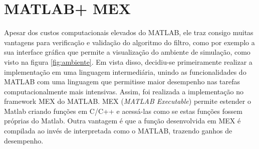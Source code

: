 \documentclass[
	12pt,				%
	openright,			%
	oneside,			%
	a4paper,			%
	english,			%
	french,				%
	spanish,			%
	brazil,				%
	]{abntex2}
\begin{document}



\section{MATLAB\texttrademark + MEX}
\label{sec:matlab_mex}

Apesar dos custos computacionais elevados do MATLAB, ele traz consigo muitas vantagens para verificação e validação do algoritmo do filtro, como por exemplo a sua interface gráfica que permite a visualização do ambiente de simulação, como visto na figura \ref{fig:ambiente}. Em vista disso, decidiu-se primeiramente realizar a implementação em uma linguagem intermediária, unindo as funcionalidades do MATLAB com uma linguagem que permitisse maior desempenho nas tarefas computacionalmente mais intensivas. Assim, foi realizada a implementação no framework MEX do MATLAB. MEX (\emph{MATLAB Executable}) permite estender o Matlab criando funções em C/C++ e acessá-las como se estas funções fossem próprias do Matlab. Outra vantagem é que a função desenvolvida em MEX é compilada ao invés de interpretada como o MATLAB, trazendo ganhos de desempenho.

\end{document}

